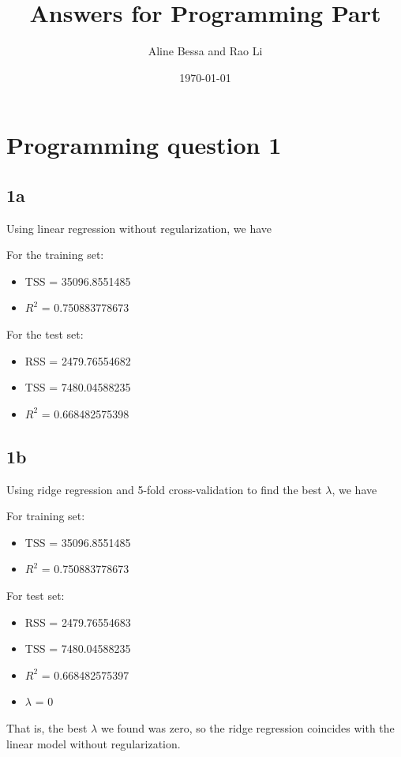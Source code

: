 \documentclass[leqno]{article}
\title{Answers for Programming Part}
\author{Aline Bessa and Rao Li}
\date\today
\begin{document}
\maketitle %

\section*{Programming question 1} 

\subsection*{1a} Using linear regression without regularization, we have

For the training set:
\begin{itemize}
\item TSS = 35096.8551485
\item $R^2$ = 0.750883778673
\end{itemize}

For the test set:
\begin{itemize}
\item RSS = 2479.76554682
\item TSS = 7480.04588235
\item $R^2$ = 0.668482575398
\end{itemize}

\subsection*{1b} Using ridge regression and 5-fold cross-validation to find the best $\lambda$, we have

For training set:
\begin{itemize}
\item TSS = 35096.8551485
\item $R^2$ = 0.750883778673
\end{itemize}

For test set:
\begin{itemize}
\item RSS = 2479.76554683
\item TSS = 7480.04588235
\item $R^2$ = 0.668482575397
\item $\lambda$ = 0
\end{itemize}
That is, the best $\lambda$ we found was zero, so the ridge regression coincides with the 
linear model without regularization.
\end{document}
